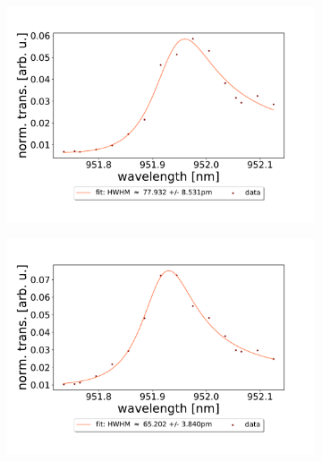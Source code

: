 \begin{figure}[h!]
\begin{subfigure}[b]{0.49\textwidth}
        \includegraphics[width=\textwidth]{figures/results/double fano fits/20250326/323um_M3:M5_fit_3.pdf}
        \caption{}
        \label{fig:323um_M3:M5_fit_3}
    \end{subfigure}
    \begin{subfigure}[b]{0.49\textwidth}
        \includegraphics[width=\textwidth]{figures/results/double fano fits/20250326/323um_M3:M5_fit_4.pdf}
        \caption{}
        \label{fig:323um_M3:M5_fit_4}
    \end{subfigure}
    \begin{subfigure}[b]{0.49\textwidth}

\end{subfigure}
\end{figure}
